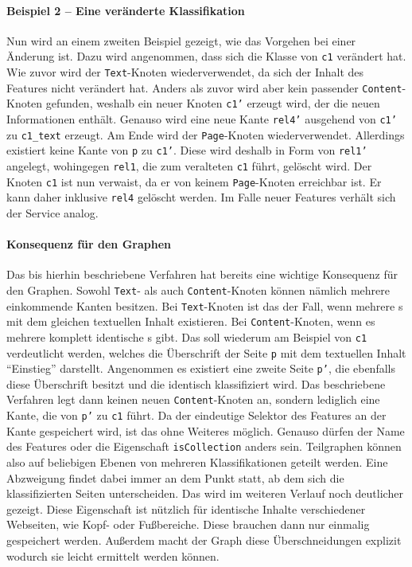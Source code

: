     \paragraph{Beispiel 2 -- Eine veränderte Klassifikation}
    Nun wird an einem zweiten Beispiel gezeigt,
    wie das Vorgehen bei einer Änderung ist.
    Dazu wird angenommen, dass sich die Klasse von \texttt{c1} verändert hat.
    Wie zuvor wird der \texttt{Text}-Knoten wiederverwendet,
    da sich der Inhalt des Features nicht verändert hat.
    Anders als zuvor wird aber kein passender \texttt{Content}-Knoten gefunden,
    weshalb ein neuer Knoten \texttt{c1'} erzeugt wird, der die neuen Informationen enthält.
    Genauso wird eine neue Kante \texttt{rel4'} ausgehend von \texttt{c1'} zu \texttt{c1\_text} erzeugt.
    Am Ende wird der \texttt{Page}-Knoten wiederverwendet.
    Allerdings existiert keine Kante von \texttt{p} zu \texttt{c1'}.
    Diese wird deshalb in Form von \texttt{rel1'} angelegt,
    wohingegen \texttt{rel1}, die zum veralteten \texttt{c1} führt, gelöscht wird.
    Der Knoten \texttt{c1} ist nun verwaist, da er von keinem \texttt{Page}-Knoten erreichbar ist.
    Er kann daher inklusive \texttt{rel4} gelöscht werden.
    Im Falle neuer Features verhält sich der Service analog.

    \paragraph{Konsequenz für den Graphen}
    Das bis hierhin beschriebene Verfahren hat bereits eine wichtige
    Konsequenz für den Graphen.
    Sowohl \texttt{Text}- als auch \texttt{Content}-Knoten können nämlich mehrere einkommende Kanten besitzen.
    Bei \texttt{Text}-Knoten ist das der Fall, wenn mehrere {\contentFeature}s mit dem gleichen textuellen Inhalt existieren.
    Bei \texttt{Content}-Knoten, wenn es mehrere komplett identische {\contentFeature}s gibt.
    Das soll wiederum am Beispiel von \texttt{c1} verdeutlicht werden,
    welches die Überschrift der Seite \texttt{p} mit dem textuellen Inhalt "`Einstieg"' darstellt.
    Angenommen es existiert eine zweite Seite \texttt{p'},
    die ebenfalls diese Überschrift besitzt und die identisch klassifiziert wird.
    Das beschriebene Verfahren legt dann keinen neuen \texttt{Content}-Knoten an,
    sondern lediglich eine Kante, die von \texttt{p'} zu \texttt{c1} führt.
    Da der eindeutige Selektor des Features an der Kante gespeichert wird, ist das ohne Weiteres möglich.
    Genauso dürfen der Name des Features oder die Eigenschaft \texttt{isCollection} anders sein.
    Teilgraphen können also auf beliebigen Ebenen von mehreren Klassifikationen geteilt werden.
    Eine Abzweigung findet dabei immer an dem Punkt statt,
    ab dem sich die klassifizierten Seiten unterscheiden.
    Das wird im weiteren Verlauf noch deutlicher gezeigt.    
    Diese Eigenschaft ist nützlich für identische Inhalte
    verschiedener Webseiten, wie Kopf- oder Fußbereiche.
    Diese brauchen dann nur einmalig gespeichert werden.
    Außerdem macht der Graph diese Überschneidungen explizit wodurch sie leicht
    ermittelt werden können.

